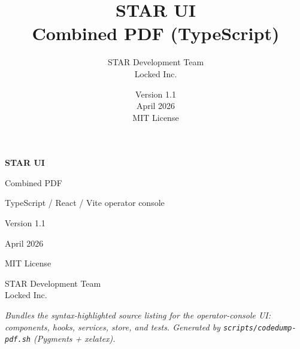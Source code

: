 \documentclass[11pt,letterpaper]{article}
\title{\Huge\bfseries STAR UI\\[0.4em]\Large Combined PDF (TypeScript)}
\author{STAR Development Team \\ Locked Inc.}
\date{Version 1.1 \\ April 2026 \\ MIT License}
\begin{document}
\begin{titlepage}
\centering
\vspace*{2.5cm}

{\Huge\bfseries STAR UI\par}
\vspace{0.3cm}
{\LARGE Combined PDF\par}
\vspace{0.3cm}
{\large TypeScript / React / Vite operator console\par}

\vfill

{\large Version 1.1\par}
{\large April 2026\par}
\vspace{0.4cm}
{\large MIT License\par}

\vfill

{\normalsize STAR Development Team\\Locked Inc.\par}
\vspace{0.8cm}

{\small\itshape Bundles the syntax-highlighted source listing for the
operator-console UI: components, hooks, services, store, and tests.
Generated by \texttt{scripts/codedump-pdf.sh} (Pygments + xelatex).\par}
\end{titlepage}

\tableofcontents
\newpage


\end{document}
